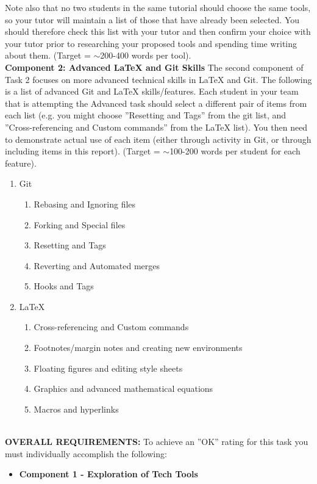 \documentclass[a4paper, 11pt]{report}
\begin{document}
{Note also that no two students in the same tutorial should choose the same tools, so your tutor will maintain a list of those that have already been selected. You should therefore check this list with your tutor and then confirm your choice with your tutor prior to researching your proposed tools and spending time writing about them. (Target = $\sim$200-400 words per tool).\\[2mm]
\textbf{Component 2: Advanced LaTeX and Git Skills}
The second component of Task 2 focuses on more advanced technical skills in LaTeX and Git. The following is a list of advanced Git and LaTeX skills/features. Each student in your team that is attempting the Advanced task should select a different pair of items from each list (e.g. you might choose ''Resetting and Tags'' from the git list, and ''Cross-referencing and Custom commands'' from the LaTeX list). You then need to demonstrate actual use of each item (either through activity in Git, or through including items in this report). (Target = $\sim$100-200 words per student for each feature).
\begin{enumerate}
\item{Git}
	\begin{enumerate}
	\item Rebasing and Ignoring files 
	\item Forking and Special files 
	\item Resetting and Tags 
	\item Reverting and Automated merges 
	\item Hooks and Tags 
	\end{enumerate}
\item LaTeX 
	\begin{enumerate}
	\item Cross-referencing and Custom commands 
	\item Footnotes/margin notes and creating new environments 
	\item Floating figures and editing style sheets 
	\item Graphics and advanced mathematical equations 
	\item Macros and hyperlinks
	\end{enumerate}
\end{enumerate}
~\\[2mm]
\textbf{OVERALL REQUIREMENTS:}
To achieve an ''OK'' rating for this task you must individually accomplish the following:
\begin{itemize}
\item \textbf{Component 1 - Exploration of Tech Tools}

\end{itemize}}
\end{document}
